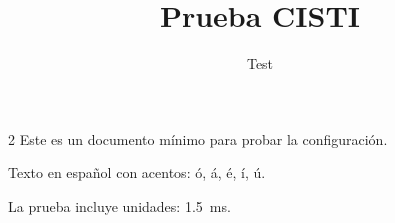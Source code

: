 \documentclass[10pt,a4paper]{article}
\begin{document}
\title{Prueba CISTI}
\author{Test}
\maketitle

\begin{multicols}{2}
Este es un documento mínimo para probar la configuración.

Texto en español con acentos: ó, á, é, í, ú.

La prueba incluye unidades: \SI{1.5}{\milli\second}.

\end{multicols}
\end{document}
